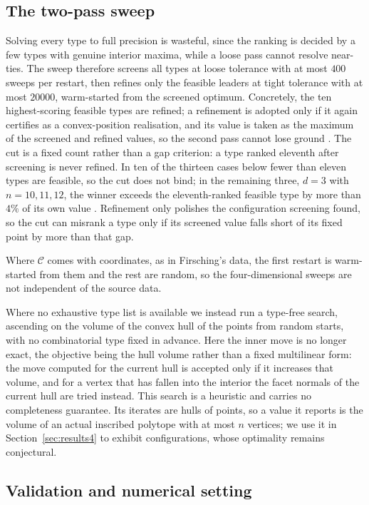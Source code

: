 \subsection{The two-pass sweep}

Solving every type to full precision is wasteful, since the ranking is decided
by a few types with genuine interior maxima, while a loose pass cannot resolve
near-ties. The sweep therefore screens all types at loose tolerance with at
most $400$ sweeps per restart, then refines only the feasible leaders at tight
tolerance with at most $20000$, warm-started from the screened optimum. Concretely, the ten highest-scoring
feasible types are refined; a refinement is adopted only if it again certifies
as a convex-position realisation, and its value is taken as the maximum of the
screened and refined values, so the second pass cannot lose ground
. The cut is
a fixed count rather than a gap criterion: a type ranked eleventh after
screening is never refined. In ten of the thirteen cases below fewer than
eleven types are feasible, so the cut does not bind; in the remaining three,
$d = 3$ with $n = 10, 11, 12$, the winner exceeds the eleventh-ranked feasible
type by more than $4\%$ of its own value . Refinement only
polishes the configuration screening found, so the cut can misrank a type only
if its screened value falls short of its fixed point by more than that gap.

Where $\mathcal{C}$ comes with coordinates, as in Firsching's data, the first
restart is warm-started from them and the rest are random, so the
four-dimensional sweeps are not independent of the source data.

Where no exhaustive type list is available we instead run a type-free search,
ascending on the volume of the convex hull of the points from random starts,
with no combinatorial type fixed in advance. Here the inner move is no longer
exact, the objective being the hull volume rather than a fixed multilinear
form: the move computed for the current hull is accepted only if it increases
that volume, and for a vertex that has fallen into the interior the facet
normals of the current hull are tried instead. This search is a heuristic and
carries no completeness guarantee. Its iterates are hulls of points, so a value
it reports is the volume of an actual inscribed polytope with at most $n$
vertices; we use it in
Section~\ref{sec:results4} to exhibit configurations, whose optimality remains
conjectural.

\subsection{Validation and numerical setting}

